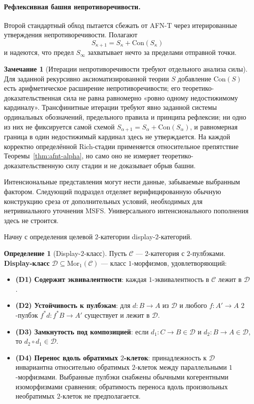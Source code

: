 \documentclass[11pt]{article}
\theoremstyle{plain}
\theoremstyle{definition}
\newtheorem{definition}[theorem]{Определение}
\newtheorem{remark}[theorem]{Замечание}
\newcommand{\cC}{\mathcal{C}}
\newcommand{\cD}{\mathcal{D}}
\newcommand{\Mor}{\mathrm{Mor}}
\newcommand{\Con}{\mathrm{Con}}
\begin{document}
\paragraph{Рефлексивная башня непротиворечивости.} Второй стандартный обход пытается сбежать от AFN-T через итерированные утверждения непротиворечивости. Полагают
\[ S_{\kappa+1} = S_\kappa + \Con(S_\kappa) \]
и надеются, что предел $S_\infty$ захватывает нечто за пределами отправной точки.

\begin{remark}[Итерации непротиворечивости требуют отдельного анализа силы]\label{thm:reflective}
Для заданной рекурсивно аксиоматизированной теории $S$ добавление $\mathrm{Con}(S)$ есть арифметическое расширение непротиворечивости; его теоретико-доказательственная сила не равна равномерно «ровно одному недостижимому кардиналу». Трансфинитные итерации требуют явно заданной системы ординальных обозначений, предельного правила и принципа рефлексии; ни одно из них не фиксируется самой схемой $S_{\alpha+1} = S_\alpha + \mathrm{Con}(S_\alpha)$, и равномерная граница в один недостижимый кардинал здесь не утверждается. На каждой корректно определённой Rich-стадии применяется относительное препятствие Теоремы~\ref{thm:afnt-alpha}, но само оно не измеряет теоретико-доказательственную силу стадии и не доказывает обрыв башни.
\end{remark}

Интенсиональные представления могут нести данные, забываемые выбранным фактором. Следующий подраздел отделяет верифицированную обычную конструкцию среза от дополнительных условий, необходимых для нетривиального уточнения MSFS. Универсального интенсионального пополнения здесь не строится.

Начну с определения целевой $2$-категории display-$2$-категорий.

\begin{definition}[Display-$2$-класс]\label{def:display-class}
Пусть $\cC$ — $2$-категория с $2$-пулбэками. \textbf{Display-класс} $\cD \subseteq \Mor_1(\cC)$ — класс $1$-морфизмов, удовлетворяющий:
\begin{itemize}
\item \textbf{(D1) Содержит эквивалентности}: каждая $1$-эквивалентность в $\cC$ лежит в $\cD$.
\item \textbf{(D2) Устойчивость к пулбэкам}: для $d : B \to A$ из $\cD$ и любого $f : A' \to A$ $2$-пулбэк $f^*d : f^*B \to A'$ существует и лежит в $\cD$.
\item \textbf{(D3) Замкнутость под композицией}: если $d_1 : C \to B \in \cD$ и $d_2 : B \to A \in \cD$, то $d_2 \circ d_1 \in \cD$.
\item \textbf{(D4) Перенос вдоль обратимых $2$-клеток}: принадлежность к $\cD$ инвариантна относительно обратимых $2$-клеток между параллельными $1$-морфизмами. Выбранные пулбэки снабжены обычными когерентными изоморфизмами сравнения; обратимость переноса вдоль произвольных необратимых $2$-клеток не предполагается.
\end{itemize}
\end{definition}
\end{document}
